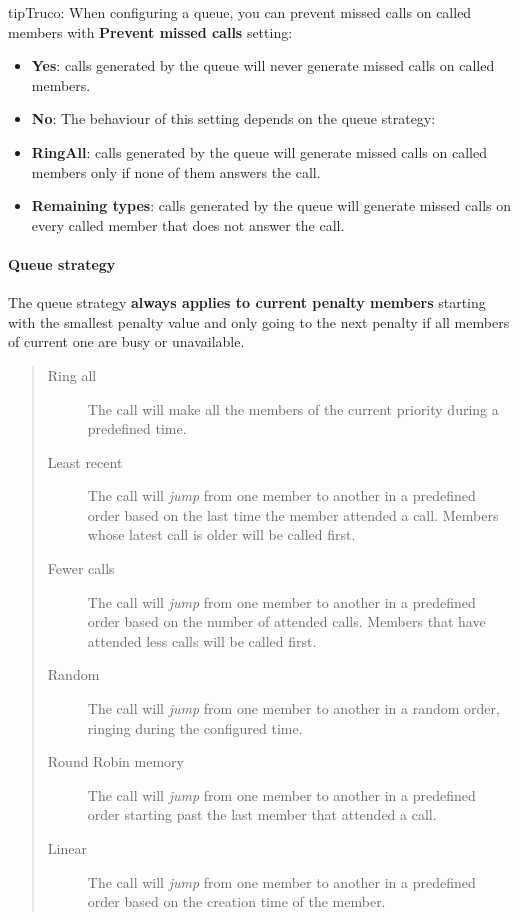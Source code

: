 \documentclass[letterpaper,10pt,spanish]{sphinxmanual}
\begin{document}
\begin{notice}{tip}{Truco:}
When configuring a queue, you can prevent missed calls on called members with \textbf{Prevent missed calls} setting:
\begin{itemize}
\item {} 
\textbf{Yes}: calls generated by the queue will never generate missed calls on called members.

\item {} 
\textbf{No}: The behaviour of this setting depends on the queue strategy:

\item {} 
\textbf{RingAll}: calls generated by the queue will generate missed calls on called members only if none of them answers the call.

\item {} 
\textbf{Remaining types}: calls generated by the queue will generate missed calls on every called member that does not answer the call.

\end{itemize}
\end{notice}


\paragraph{Queue strategy}
\label{administration_portal/client/vpbx/routing_endpoints/queues:queue-strategy}
The queue strategy \textbf{always applies to current penalty members} starting with
the smallest penalty value and only going to the next penalty if all members of
current one are busy or unavailable.
\begin{quote}
\begin{description}
\item[{Ring all}] \leavevmode
The call will make all the members of the current priority during a
predefined time.

\item[{Least recent}] \leavevmode
The call will \emph{jump} from one member to another in a predefined order
based on the last time the member attended a call. Members whose latest
call is older will be called first.

\item[{Fewer calls}] \leavevmode
The call will \emph{jump} from one member to another in a predefined order
based on the number of attended calls. Members that have attended less
calls will be called first.

\item[{Random}] \leavevmode
The call will \emph{jump} from one member to another in a random order,
ringing during the configured time.

\item[{Round Robin memory}] \leavevmode
The call will \emph{jump} from one member to another in a predefined order
starting past the last member that attended a call.

\item[{Linear}] \leavevmode
The call will \emph{jump} from one member to another in a predefined order
based on the creation time of the member.

\end{description}
\end{quote}
\end{document}
